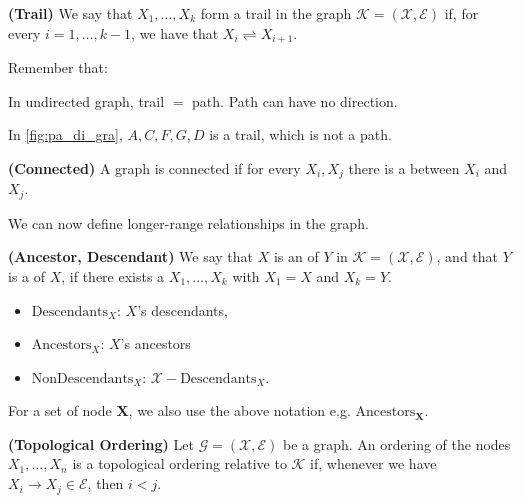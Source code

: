 \documentclass{article}
\newcommand{\bfs}[1]{\textbf{({#1}) }}
\begin{document}
\begin{defa}\bfs{Trail}
We say that $X_{1}, \ldots, X_{k}$ form a trail in the graph $\mathcal{K}=(\mathcal{X}, \mathcal{E})$ if, for every $i=1, \ldots, k-1$, we have that $X_{i} \rightleftharpoons X_{i+1}$.
\end{defa}
\begin{rema}Remember that:

\centerline{}

In undirected graph, trail $=$ path. Path can have no direction.
\end{rema}
\begin{exma}
In \cref{fig:pa_di_gra}, $A, C, F, G, D$ is a trail, which is not a path. 
\end{exma}
\begin{defa}\bfs{Connected}
A graph is connected if for every $X_{i}, X_{j}$ there is a  between $X_{i}$ and $X_{j}$.
\end{defa}


We can now define longer-range relationships in the graph.
\begin{defa}\bfs{Ancestor, Descendant}
 We say that $X$ is an  of $Y$ in $\mathcal{K}=(\mathcal{X}, \mathcal{E})$, and that $Y$ is a  of $X$, if there exists a  $X_{1}, \ldots, X_{k}$ with $X_{1}=X$ and $X_{k}=Y$. 
   \begin{itemize}
   \item $\mathrm{Descendants}_{X}$: $X$'s descendants,
    \item  $\mathrm{Ancestors}_{X}$: $X$'s ancestors
    \item $\mathrm{NonDescendants}_{X}$:  $\mathcal{X} - \mathrm{Descendants}_{X}$.
\end{itemize}

\end{defa}
\begin{rema}
 For a set of node $\boldsymbol{X}$, we also use the above notation e.g. $\mathrm{Ancestors}_{\boldsymbol{X}}$.
\end{rema}
\begin{defa}\bfs{Topological Ordering}\label{def:top_order}
 Let $\mathcal{G}=(\mathcal{X}, \mathcal{E})$ be a graph. An ordering of the nodes $X_{1}, \ldots, X_{n}$ is a topological ordering relative to $\mathcal{K}$ if, whenever we have $X_{i} \rightarrow X_{j} \in \mathcal{E}$, then $i<j$.
\end{defa}
\end{document}
